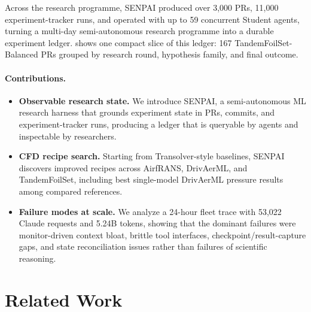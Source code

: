 \documentclass{article}
\begin{document}
Across the research programme, SENPAI produced over 3,000 PRs, 11,000 experiment-tracker runs, and operated with up to 59 concurrent Student agents, turning a multi-day semi-autonomous research programme into a durable experiment ledger.  shows one compact slice of this ledger: 167 TandemFoilSet-Balanced PRs grouped by research round, hypothesis family, and final outcome.

\paragraph{Contributions.}
\begin{itemize}[leftmargin=*,topsep=2pt,itemsep=2pt,parsep=0pt]
  \item \textbf{Observable research state.} We introduce SENPAI, a semi-autonomous ML research harness that grounds experiment state in PRs, commits, and experiment-tracker runs, producing a ledger that is queryable by agents and inspectable by researchers.
  \item \textbf{CFD recipe search.} Starting from Transolver-style baselines, SENPAI discovers improved recipes across AirfRANS, DrivAerML, and TandemFoilSet, including best single-model DrivAerML pressure results among compared references.
  \item \textbf{Failure modes at scale.} We analyze a 24-hour fleet trace with 53,022 Claude requests and 5.24B tokens, showing that the dominant failures were monitor-driven context bloat, brittle tool interfaces, checkpoint/result-capture gaps, and state reconciliation issues rather than failures of scientific reasoning.
\end{itemize}

\section{Related Work}
\end{document}

